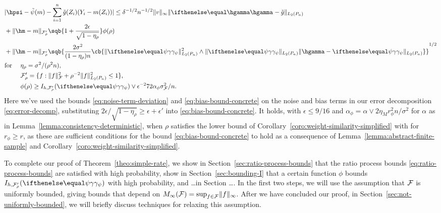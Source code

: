 \begin{equation}
\label{eq:asymptotic-linearity-abstract}
\begin{aligned}
&\abs{\hpsi - \tilde\psi(m) - \sum_{i=1}^n \gapprox(Z_i)(Y_i - m(Z_i))} \le \delta^{-1/2} n^{-1/2} \norm{v}_{\infty} \norm{\hriesz - \gapprox}_{L_2(\Pn)} \\
&+ \norm{\hm-m}_{\F'_{\rho}}\sqb{1+\frac{2\epsilon}{\sqrt{1-\eta_{\rho}}}}  \phi(\rho) \\
&+ \norm{\hm-m}_{\F'_{\rho}}\sqb{\frac{2\sigma^2}{(1-\eta_{\rho}) n}\cb{\norm{\riesz[\psi]}_{L_2(\Pn)}^2 \wedge \norm{\riesz[\psi]}_{L_2(\Pn)}\norm{\hgamma-\riesz[\psi]}_{L_2(\Pn)}}}^{1/2} \\
&\text{for \quad} \eta_\rho = \sigma^2/(\rho^2 n), \\ 
&\text{\hphantom{for \quad}} \F'_{\rho} = \set{f : \norm{f}_{\F}^2 + \rho^{-2}\norm{f}_{L_2(\Pn)}^2 \le 1}, \\
&\text{\hphantom{for \quad}} \phi(\rho) \ge I_{h,\F_{\rho}'}(\riesz[\psi]) \vee \epsilon^{-2} 72 \alpha_{\phi} \sigma_{\F}^2/n.
\end{aligned}
\end{equation}
Here we've used the bounds \eqref{eq:noise-term-deviation} and \eqref{eq:bias-bound-concrete}
on the noise and bias terms in our error decomposition \eqref{eq:error-decomp},
substituting $2\epsilon/\sqrt{1-\eta_{\rho}} \ge \epsilon + \epsilon'$ into \eqref{eq:bias-bound-concrete}.
It holds, with $\epsilon \le 9/16$ and $\alpha_{\phi} = \alpha \vee 2 \eta_M r_{\phi}^2 n / \sigma^2$ for $\alpha$ as in Lemma~\ref{lemma:consistency-deterministic},
when $\rho$ satisfies the lower bound of Corollary~\ref{coro:weight-similarity-simplified} 
with  for $r_{\phi} \ge r$, as these are sufficient conditions for the bound \eqref{eq:bias-bound-concrete} to hold
as a consequence of Lemma~\ref{lemma:abstract-finite-sample} and Corollary~\ref{coro:weight-similarity-simplified}.


To complete our proof of Theorem~\ref{theo:simple-rate}, 
we show in Section~\ref{sec:ratio-process-bounds} that the ratio process bounds \eqref{eq:ratio-process-bounds} are satisfied with high probability,
show in Section~\ref{sec:bounding-I} that a certain function $\phi$ bounds $I_{h,\F_{\rho}'}(\riesz[\psi])$ with high probability,
and \ldots in Section \ldots.
In the first two steps, we will use the assumption that $\mathcal{F}$ is uniformly bounded, giving bounds that depend on 
$M_{\infty}(\mathcal{F})=\sup_{f\in\mathcal{F}}\lVert f\rVert_{\infty}$. 
After we have concluded our proof, in Section~\ref{sec:not-uniformly-bounded}, we will briefly discuss techniques for relaxing this assumption.

